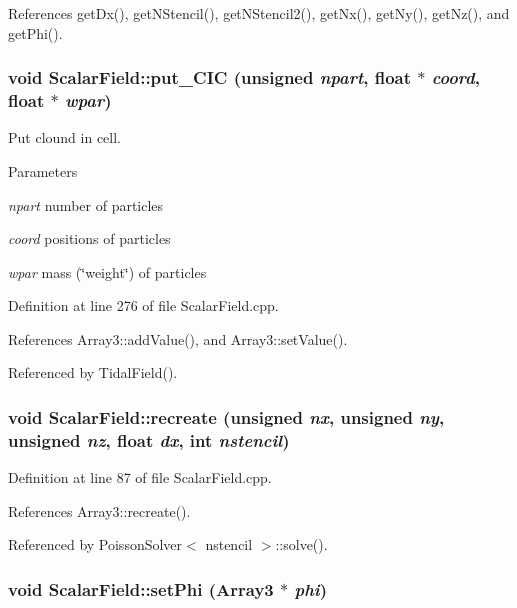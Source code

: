 References getDx(), getNStencil(), getNStencil2(), getNx(), getNy(), getNz(), and getPhi().

\subsubsection[{put\_\-CIC}]{\setlength{\rightskip}{0pt plus 5cm}void ScalarField::put\_\-CIC (unsigned {\em npart}, \/  float $\ast$ {\em coord}, \/  float $\ast$ {\em wpar})}\label{classScalarField_a75b8402bd2b6d403c9b624a2f122bca9}


Put clound in cell. 


\begin{DoxyParams}{Parameters}
\item[{\em npart}]number of particles \item[{\em coord}]positions of particles \item[{\em wpar}]mass (\char`\"{}weight\char`\"{}) of particles \end{DoxyParams}


Definition at line 276 of file ScalarField.cpp.



References Array3::addValue(), and Array3::setValue().



Referenced by TidalField().

\subsubsection[{recreate}]{\setlength{\rightskip}{0pt plus 5cm}void ScalarField::recreate (unsigned {\em nx}, \/  unsigned {\em ny}, \/  unsigned {\em nz}, \/  float {\em dx}, \/  int {\em nstencil})}\label{classScalarField_a84c4451b7ba5dbdb57267ec575f8fa86}


Definition at line 87 of file ScalarField.cpp.



References Array3::recreate().



Referenced by PoissonSolver$<$ nstencil $>$::solve().

\subsubsection[{setPhi}]{\setlength{\rightskip}{0pt plus 5cm}void ScalarField::setPhi ({\bf Array3} $\ast$ {\em phi})}\label{classScalarField_af2cc37199c70deb64889b493b90a6d13}


